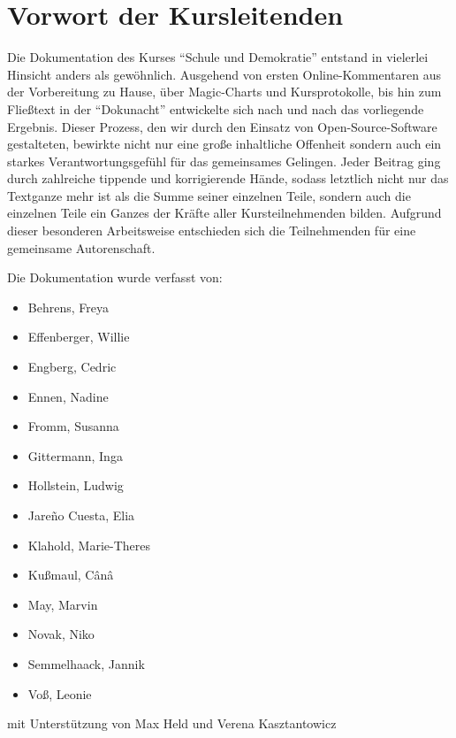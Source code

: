 \section[Vorwort]{Vorwort der Kursleitenden}

Die Dokumentation des Kurses ``Schule und Demokratie'' entstand in vielerlei Hinsicht anders als gewöhnlich.
Ausgehend von ersten Online-Kommentaren aus der Vorbereitung zu Hause, über Magic-Charts und Kursprotokolle, bis hin zum Fließtext in der ``Dokunacht'' entwickelte sich nach und nach das vorliegende Ergebnis.
Dieser Prozess, den wir durch den Einsatz von Open-Source-Software gestalteten, bewirkte nicht nur eine große inhaltliche Offenheit sondern auch ein starkes Verantwortungsgefühl für das gemeinsames Gelingen.
Jeder Beitrag ging durch zahlreiche tippende und korrigierende Hände, sodass letztlich nicht nur das Textganze mehr ist als die Summe seiner einzelnen Teile, sondern auch die einzelnen Teile ein Ganzes der Kräfte aller Kursteilnehmenden bilden.
Aufgrund dieser besonderen Arbeitsweise entschieden sich die Teilnehmenden für eine gemeinsame Autorenschaft.

Die Dokumentation wurde verfasst von:
\begin{itemize}
\item[] Behrens, Freya
\item[] Effenberger, Willie
\item[] Engberg, Cedric
\item[] Ennen, Nadine
\item[] Fromm, Susanna
\item[] Gittermann, Inga
\item[] Hollstein, Ludwig
\item[] Jareño Cuesta, Elia
\item[] Klahold, Marie-Theres
\item[] Kußmaul, Cânâ
\item[] May, Marvin
\item[] Novak, Niko
\item[] Semmelhaack, Jannik
\item[] Voß, Leonie
\end{itemize}
mit Unterstützung von Max Held und Verena Kasztantowicz